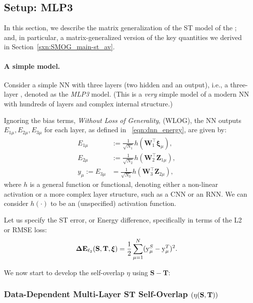 \subsection{\MultiLayer Setup: MLP3}
\label{sxn:matgen_mlp3}

In this section, we describe the matrix generalization of the ST  model of the \LinearPerceptron; and, 
in particular, a matrix-generalized version of the key quantities we derived in Section~\ref{sxn:SMOG_main-st_av}.

\paragraph{A simple model.}

Consider a simple NN with three layers (two hidden and an output), i.e., a three-layer \MultiLayerPerceptron, denoted as the \emph{MLP3} model.
(This is a \emph{very} simple model of a modern NN with hundreds of layers and complex internal structure.)

Ignoring the bias terms, \emph{Without Loss of Generality}, (WLOG), the NN outputs
 $E_{1\mu},E_{2\mu},E_{3\mu}$ for each layer, as defined in \EQN~\ref{eqn:dnn_energy}, are given by:
\begin{align}
\nonumber
  E_{1\mu} &:= \frac{1}{\sqrt{N_1}} h (\mathbf{W}_1^\top \boldsymbol{\xi}_{\mu}) , \\
\nonumber
  E_{2\mu} &:= \frac{1}{\sqrt{N_2}} h (\mathbf{W}_2^\top \mathbf{Z}_{1\mu})     , \\
\label{eqn:nflow}
             y_{\mu} := E_{3\mu} &= \frac{1}{\sqrt{N_3}} h (\mathbf{W}_{3}^\top \mathbf{Z}_{2\mu})     ,
\end{align}
where $h$ is a general function or functional, denoting either a non-linear activation or a more complex layer structure, such as a CNN or an RNN.
We can consider $h(\cdot)$ to be an (unspecified) activation function.

Let us specify the ST error, or Energy difference, specifically in terms of the L2 or RMSE loss:
\begin{equation}
\label{eqn:DE}
\mathbf{\Delta {E}}_{\ell_2}({\mathbf{S}},{\mathbf{T}}, \boldsymbol{\xi}) = \frac{1}{2}\sum_{\mu=1}^{N} (\mathrm{y}_{\mu}^{S} - \mathrm{y}_{\mu}^{T})^2.
\end{equation}

We now start to develop the self-overlap \(\eta\) using \(\mathbf{S} - \mathbf{T}\):

\subsubsection{Data-Dependent Multi-Layer ST Self-Overlap $(\eta({\mathbf{S}},{\mathbf{T}}))$}

